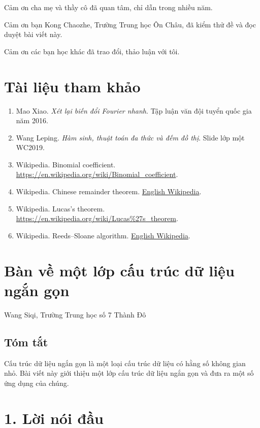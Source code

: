 \documentclass[11pt]{article}
\begin{document}
Cảm ơn cha mẹ và thầy cô đã quan tâm, chỉ dẫn trong nhiều năm.

Cảm ơn bạn Kong Chaozhe, Trường Trung học Ôn Châu, đã kiểm thử đề và đọc
duyệt bài viết này.

Cảm ơn các bạn học khác đã trao đổi, thảo luận với tôi.

\section*{Tài liệu tham khảo}

\begin{enumerate}
  \item Mao Xiao. \emph{Xét lại biến đổi Fourier nhanh}. Tập luận văn đội
        tuyển quốc gia năm 2016.
  \item Wang Leping. \emph{Hàm sinh, thuật toán đa thức và đếm đồ thị}. Slide
        lớp một WC2019.
  \item Wikipedia. Binomial coefficient.
        \url{https://en.wikipedia.org/wiki/Binomial_coefficient}.
  \item Wikipedia. Chinese remainder theorem.
        \href{https://en.wikipedia.org/wiki/Chinese_remainder_theorem}{English
        Wikipedia}.
  \item Wikipedia. Lucas's theorem.
        \url{https://en.wikipedia.org/wiki/Lucas\%27s_theorem}.
  \item Wikipedia. Reeds--Sloane algorithm.
        \href{https://en.wikipedia.org/wiki/Reeds--Sloane_algorithm}{English
        Wikipedia}.
\end{enumerate}

\clearpage
\section*{Bàn về một lớp cấu trúc dữ liệu ngắn gọn}

\begin{center}
Wang Siqi, Trường Trung học số 7 Thành Đô
\end{center}

\subsection*{Tóm tắt}

Cấu trúc dữ liệu ngắn gọn là một loại cấu trúc dữ liệu có hằng số không gian
nhỏ. Bài viết này giới thiệu một lớp cấu trúc dữ liệu ngắn gọn và đưa ra một
số ứng dụng của chúng.

\section*{1. Lời nói đầu}
\end{document}
